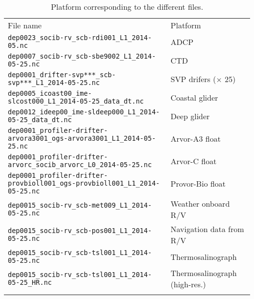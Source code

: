 \documentclass[essd,manuscript]{copernicus}
\begin{document}
\begin{table*}[h]
\caption{Platform corresponding to the different files.\label{tab:filenales}}
\begin{tabular}{ll}
\tophline
File name				& Platform 															\\
\middlehline
\verb#dep0023_socib-rv_scb-rdi001_L1_2014-05.nc#					& ADCP								\\
\verb#dep0007_socib-rv_scb-sbe9002_L1_2014-05-25.nc#				& CTD 								\\
\verb#dep0001_drifter-svp***_scb-svp***_L1_2014-05-25.nc#			& SVP drifers ($\times$ 25)		\\
\verb#dep0005_icoast00_ime-slcost000_L1_2014-05-25_data_dt.nc#	& Coastal glider 					\\
\verb#dep0012_ideep00_ime-sldeep000_L1_2014-05-25_data_dt.nc#		& Deep glider 	 					\\
\verb#dep0001_profiler-drifter-arvora3001_ogs-arvora3001_L1_2014-05-25.nc#	& Arvor-A3 float		\\
\verb#dep0001_profiler-drifter-arvorc_socib_arvorc_L0_2014-05-25.nc# 			& Arvor-C float			\\
\verb#dep0001_profiler-drifter-provbioll001_ogs-provbioll001_L1_2014-05-25.nc# & Provor-Bio float	\\
\verb#dep0015_socib-rv_scb-met009_L1_2014-05-25.nc#				& Weather onboard  R/V 				\\
\verb#dep0015_socib-rv_scb-pos001_L1_2014-05-25.nc#				& Navigation data from R/V 		\\
\verb#dep0015_socib-rv_scb-tsl001_L1_2014-05-25.nc#				& Thermosalinograph					\\
\verb#dep0015_socib-rv_scb-tsl001_L1_2014-05-25_HR.nc#			& Thermosalinograph (high-res.)	\\
\bottomhline
\end{tabular}
\end{table*}



\end{document}
